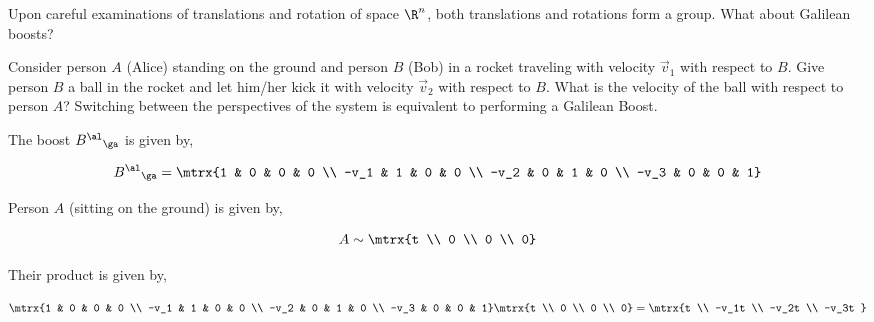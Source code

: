 \documentclass{article}
\begin{document}
Upon careful examinations of translations and rotation of space $\R^n$, both translations and rotations form a group. What about Galilean boosts? \\

\newcommand{\wrt}{with respect to }

Consider person $A$ (Alice) standing on the ground and person $B$ (Bob) in a rocket traveling with velocity $\vec{v}_1$ \wrt $B$. Give person $B$ a ball in the rocket and let him/her kick it with velocity $\vec{v}_2$ \wrt $B$. What is the velocity of the ball \wrt person $A$? Switching between the perspectives of the system is equivalent to performing a Galilean Boost. \\


\begin{center}
\end{center}

The boost ${B^{\al}}_\ga$ is given by,

\[ {B^{\al}}_\ga = \mtrx{1 & 0 & 0 & 0 \\ -v_1 & 1 & 0 & 0 \\ -v_2 & 0 & 1 & 0 \\ -v_3 & 0 & 0 & 1} \]

Person $A$ (sitting on the ground) is given by,

\[ A \sim \mtrx{t \\ 0 \\ 0 \\ 0} \]

Their product is given by,

\[ \mtrx{1 & 0 & 0 & 0 \\ -v_1 & 1 & 0 & 0 \\ -v_2 & 0 & 1 & 0 \\ -v_3 & 0 & 0 & 1} \mtrx{t \\ 0 \\ 0 \\ 0} = \mtrx{t \\ -v_1t \\ -v_2t \\ -v_3t }\]
\end{document}
